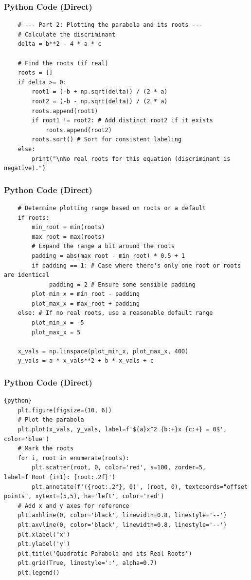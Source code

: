 \documentclass{beamer}
\begin{document}
\begin{frame}[fragile]
\frametitle{Python Code (Direct)}
\begin{lstlisting}
    # --- Part 2: Plotting the parabola and its roots ---
    # Calculate the discriminant
    delta = b**2 - 4 * a * c

    # Find the roots (if real)
    roots = []
    if delta >= 0:
        root1 = (-b + np.sqrt(delta)) / (2 * a)
        root2 = (-b - np.sqrt(delta)) / (2 * a)
        roots.append(root1)
        if root1 != root2: # Add distinct root2 if it exists
            roots.append(root2)
        roots.sort() # Sort for consistent labeling
    else:
        print("\nNo real roots for this equation (discriminant is negative).")
\end{lstlisting}
\end{frame}

\begin{frame}[fragile]
\frametitle{Python Code (Direct)}
\begin{lstlisting}
    # Determine plotting range based on roots or a default
    if roots:
        min_root = min(roots)
        max_root = max(roots)
        # Expand the range a bit around the roots
        padding = abs(max_root - min_root) * 0.5 + 1
        if padding == 1: # Case where there's only one root or roots are identical
             padding = 2 # Ensure some sensible padding
        plot_min_x = min_root - padding
        plot_max_x = max_root + padding
    else: # If no real roots, use a reasonable default range
        plot_min_x = -5
        plot_max_x = 5

    x_vals = np.linspace(plot_min_x, plot_max_x, 400)
    y_vals = a * x_vals**2 + b * x_vals + c
\end{lstlisting}
\end{frame}

\begin{frame}[fragile]
\frametitle{Python Code (Direct)}
\begin{lstlisting}{python}
    plt.figure(figsize=(10, 6))
    # Plot the parabola
    plt.plot(x_vals, y_vals, label=f'${a}x^2 {b:+}x {c:+} = 0$', color='blue')
    # Mark the roots
    for i, root in enumerate(roots):
        plt.scatter(root, 0, color='red', s=100, zorder=5, label=f'Root {i+1}: {root:.2f}')
        plt.annotate(f'({root:.2f}, 0)', (root, 0), textcoords="offset points", xytext=(5,5), ha='left', color='red')
    # Add x and y axes for reference
    plt.axhline(0, color='black', linewidth=0.8, linestyle='--')
    plt.axvline(0, color='black', linewidth=0.8, linestyle='--')
    plt.xlabel('x')
    plt.ylabel('y')
    plt.title('Quadratic Parabola and its Real Roots')
    plt.grid(True, linestyle=':', alpha=0.7)
    plt.legend()
\end{lstlisting}
\end{frame}
\end{document}
